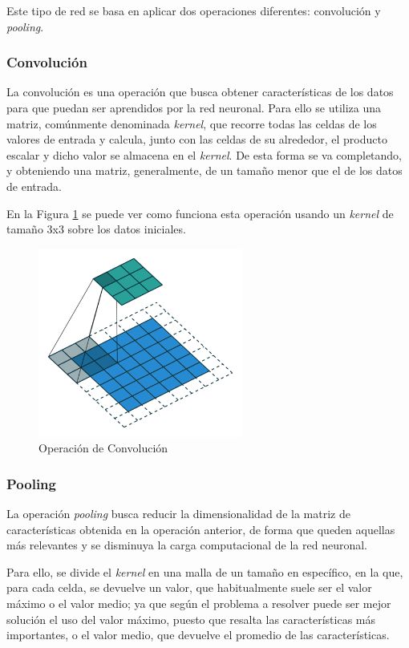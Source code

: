 Este tipo de red se basa en aplicar dos operaciones diferentes: convolución y \emph{pooling}.

\subsubsection{Convolución}
La convolución \cite{prieto2019redes} es una operación que busca obtener características de los datos para que puedan ser aprendidos por la red neuronal. Para ello se utiliza una matriz, comúnmente denominada \emph{kernel}, que recorre todas las celdas de los valores de entrada y calcula, junto con las celdas de su alrededor, el producto escalar y dicho valor se almacena en el \emph{kernel}. De esta forma se va completando, y obteniendo una matriz, generalmente, de un tamaño menor que el de los datos de entrada.

En la Figura \ref{f:convo} se puede ver como funciona esta operación usando un \emph{kernel} de tamaño 3x3 sobre los datos iniciales.

\begin{figure}[h]
 \centering
  \includegraphics[width=0.6\textwidth]{img/Convo.png}
 \caption{Operación de Convolución \cite{wiki:convo}}
 \label{f:convo}
\end{figure}

\subsubsection{Pooling}
La operación \emph{pooling} \cite{prieto2019redes} busca reducir la dimensionalidad de la matriz de características obtenida en la operación anterior, de forma que queden aquellas más relevantes y se disminuya la carga computacional de la red neuronal.

Para ello, se divide el \emph{kernel} en una malla de un tamaño en específico, en la que, para cada celda, se devuelve un valor, que habitualmente suele ser el valor máximo o el valor medio; ya que según el problema a resolver puede ser mejor solución el uso del valor máximo, puesto que resalta las características más importantes, o el valor medio, que devuelve el promedio de las características.

